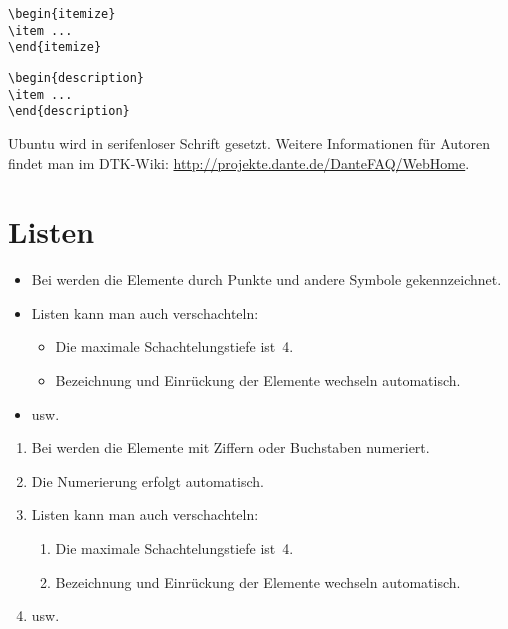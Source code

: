 \documentclass[ngerman]{dtk}
\begin{document}
\begin{lstlisting}[style=number]
\begin{itemize}
\item ...
\end{itemize}
\end{lstlisting}

\begin{lstlisting}[style=noNumber]
\begin{description}
\item ...
\end{description}
\end{lstlisting}

\textsf{Ubuntu} wird in serifenloser Schrift gesetzt.
Weitere Informationen für Autoren findet man im DTK-Wiki:
\url{http://projekte.dante.de/DanteFAQ/WebHome}.


\section{Listen}
\begin{itemize}
\item Bei  werden
die Elemente durch Punkte und andere Symbole gekennzeichnet. 
\item Listen kann man auch verschachteln:
  \begin{itemize}
  \item Die maximale Schachtelungstiefe ist~4.~\cite{voss:2012}
  \item
  Bezeichnung und Ein\-rückung der Elemente
  wechseln automatisch.
  \end{itemize}
\item usw.
\end{itemize}

\begin{enumerate}
\item Bei  werden
die Elemente mit Ziffern oder Buchstaben numeriert.
\item Die Numerierung erfolgt automatisch.~\cite{pakin:2008}
\item Listen kann man auch
verschachteln:
  \begin{enumerate}
  \item Die maximale Schachtelungstiefe
  ist~4.
  \item Bezeichnung und Ein\-rückung der Elemente
  wechseln automatisch.
  \end{enumerate}
\item usw.
\end{enumerate}
\end{document}
